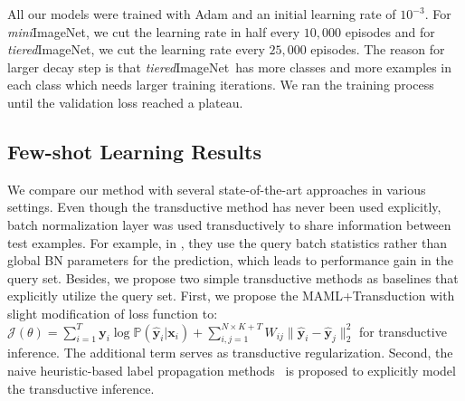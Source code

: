 \documentclass{article} \usepackage{iclr2019_conference,times}
\def\mini{{\textit{mini}ImageNet}}
\def\tiered{{\textit{tiered}ImageNet}}
\def\bfx{\mathbf{x}}
\begin{document}
All our models were trained with Adam \citep{adam} and an initial learning rate of $10^{-3}$. For \mini, we cut the learning rate in half every $10,000$ episodes and for \tiered, we cut the learning rate every $25,000$ episodes. The reason for larger decay step is that \tiered~has more classes and more examples in each class which needs larger training iterations. We ran the training process until the validation loss reached a plateau.

\subsection{Few-shot Learning Results}





We compare our method with several state-of-the-art approaches in various settings. Even though the transductive method has never been used explicitly, batch normalization layer was used transductively to share information between test examples. For example, in \cite{maml,first-order}, they use the query batch statistics rather than global BN parameters for the prediction, which leads to performance gain in the query set. 
Besides, we propose two simple transductive methods as baselines that explicitly utilize the query set. First, we propose the MAML+Transduction with slight modification of loss function to: $\mathcal{J}(\theta) = \sum_{i=1}^{T}\mathbf{y}_i\log \mathbb{P}(\widehat{\mathbf{y}}_i|\bfx_i) + \sum_{i,j=1}^{N\times K+T}W_{ij}\|\widehat{\mathbf{y}}_i-\widehat{\mathbf{y}}_j\|_2^2$ for transductive inference. The additional term serves as transductive regularization. Second, the naive heuristic-based label propagation methods~\citep{labelprop1} is proposed to explicitly model the transductive inference.  
\end{document}
